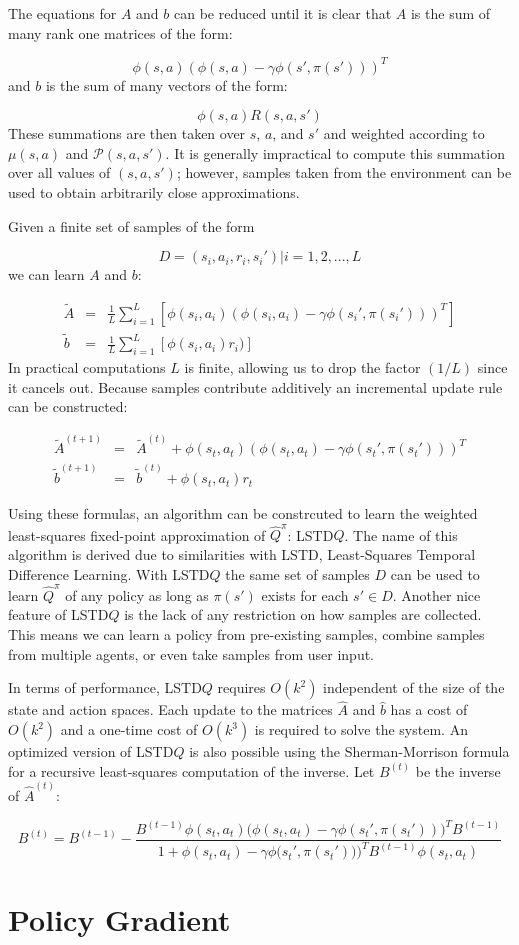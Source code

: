 The equations for $A$ and $b$ can be reduced until it is clear that $A$ is the sum of many rank one matrices of the form:

\[
    \phi(s,a)(\phi(s,a) - \gamma\phi(s',\pi(s')))^T
\]
and $b$ is the sum of many vectors of the form:

\[
    \phi(s,a)R(s,a,s')
\]
These summations are then taken over $s$, $a$, and $s'$ and weighted according to $\mu(s,a)$ and $\mathcal{P}(s,a,s')$. It is generally impractical to compute this summation over all values of $(s,a,s')$; however, samples taken from the environment can be used to obtain arbitrarily close approximations.

Given a finite set of samples of the form

\[
    D = { (s_i,a_i,r_i,s_i') | i = 1,2,...,L}
\]
we can learn $A$ and $b$:

\[
    \begin{array}{rcl}
        \tilde{A} &=& \frac{1}{L}\displaystyle\sum_{i=1}^L[\phi(s_i,a_i)(\phi(s_i,a_i) - \gamma\phi(s_i',\pi(s_i')))^T] \\
        \tilde{b} &=& \frac{1}{L}\displaystyle\sum_{i=1}^L[\phi(s_i,a_i)r_i)]
    \end{array}
\]
In practical computations $L$ is finite, allowing us to drop the factor $(1/L)$ since it cancels out. Because samples contribute additively an incremental update rule can be constructed:

\[
    \begin{array}{rcl}
        \tilde{A}^{(t+1)} &=& \tilde{A}^{(t)} + \phi(s_t,a_t)(\phi(s_t,a_t) - \gamma\phi(s_t',\pi(s_t')))^T \\
        \tilde{b}^{(t+1)} &=& \tilde{b}^{(t)} + \phi(s_t,a_t)r_t
    \end{array}
\]

Using these formulas, an algorithm can be constrcuted to learn the weighted least-squares fixed-point approximation of $\hat{Q}^\pi$: LSTD$Q$. The name of this algorithm is derived due to similarities with LSTD, Least-Squares Temporal Difference Learning. With LSTD$Q$ the same set of samples $D$ can be used to learn $\hat{Q}^\pi$ of any policy as long as $\pi(s')$ exists for each $s' \in D$. Another nice feature of LSTD$Q$ is the lack of any restriction on how samples are collected. This means we can learn a policy from pre-existing samples, combine samples from multiple agents, or even take samples from user input.

In terms of performance, LSTD$Q$ requires $O(k^2)$ independent of the size of the state and action spaces. Each update to the matrices $\hat{A}$ and $\hat{b}$ has a cost of $O(k^2)$ and a one-time cost of $O(k^3)$ is required to solve the system. An optimized version of LSTD$Q$ is also possible using the Sherman-Morrison formula for a recursive least-squares computation of the inverse. Let $B^{(t)}$ be the inverse of $\hat{A}^{(t)}$:

\[
    B^{(t)} = B^{(t-1)} - \frac{B^{(t-1)}\phi(s_t,a_t)\big(\phi(s_t,a_t) - \gamma\phi(s_t',\pi(s_t'))\big)^TB^{(t-1)}}{1 + \phi(s_t,a_t) - \gamma\phi\big(s_t',\pi(s_t'))\big)^TB^{(t-1)}\phi(s_t,a_t)}
\]

\section{Policy Gradient}